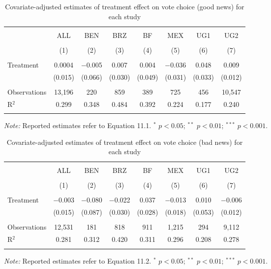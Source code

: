 \documentclass[]{article}
\begin{document}
\begin{table}[htb] \centering 
  \caption{Covariate-adjusted estimates of treatment effect on vote choice (good news) for each study} 
  \label{} 
\begin{tabular}{@{\extracolsep{1pt}}lccccccc} 
\\[-1.8ex]\hline 
\hline \\[-1.8ex] 
 & ALL & BEN & BRZ & BF & MEX & UG1 & UG2 \\ 
\\[-1.8ex] & (1) & (2) & (3) & (4) & (5) & (6) & (7)\\ 
\hline \\[-1.8ex] 
 Treatment & 0.0004 & $-$0.005 & 0.007 & 0.004 & $-$0.036 & 0.048 & 0.009 \\ 
  & (0.015) & (0.066) & (0.030) & (0.049) & (0.031) & (0.033) & (0.012) \\ 
\hline \\[-1.8ex] 
Observations & 13,196 & 220 & 859 & 389 & 725 & 456 & 10,547 \\ 
R$^{2}$ & 0.299 & 0.348 & 0.484 & 0.392 & 0.224 & 0.177 & 0.240 \\ 
\hline 
\hline \\[-1.8ex] 
\end{tabular} 
\begin{flushleft}\textit{Note:} Reported estimates refer to Equation 11.1. $^*$ $p<0.05$; $^{**}$ $p<0.01$; $^{***}$ $p<0.001$. \end{flushleft}
\end{table}

\begin{table}[htb] \centering 
  \caption{Covariate-adjusted estimates of treatment effect on vote choice (bad news) for each study} 
  \label{} 
\begin{tabular}{@{\extracolsep{1pt}}lccccccc} 
\\[-1.8ex]\hline 
\hline \\[-1.8ex] 
 & ALL & BEN & BRZ & BF & MEX & UG1 & UG2 \\ 
\\[-1.8ex] & (1) & (2) & (3) & (4) & (5) & (6) & (7)\\ 
\hline \\[-1.8ex] 
 Treatment & $-$0.003 & $-$0.080 & $-$0.022 & 0.037 & $-$0.013 & 0.010 & $-$0.006 \\ 
  & (0.015) & (0.087) & (0.030) & (0.028) & (0.018) & (0.053) & (0.012) \\ 
\hline \\[-1.8ex] 
Observations & 12,531 & 181 & 818 & 911 & 1,215 & 294 & 9,112 \\ 
R$^{2}$ & 0.281 & 0.312 & 0.420 & 0.311 & 0.296 & 0.208 & 0.278 \\ 
\hline 
\hline \\[-1.8ex] 
\end{tabular} 
\begin{flushleft}\textit{Note:} Reported estimates refer to Equation 11.2. $^*$ $p<0.05$; $^{**}$ $p<0.01$; $^{***}$ $p<0.001$. \end{flushleft}
\end{table}
\end{document}
